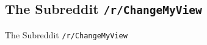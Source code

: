 \documentclass{beamer}
\begin{document}
\subsection{The Subreddit \texttt{/r/ChangeMyView}}
\begin{frame}{The Subreddit \texttt{/r/ChangeMyView}}
\begin{figure}

\end{figure}
\end{frame}
\end{document}
